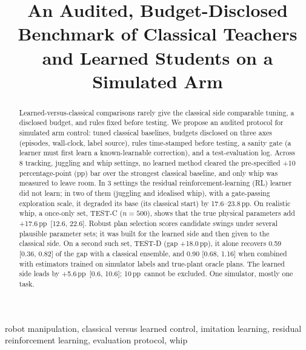 \documentclass[conference]{IEEEtran}
\newcommand{\pp}{\,pp}
\begin{document}
\title{An Audited, Budget-Disclosed Benchmark of Classical Teachers\\and Learned Students on a Simulated Arm}

\author{
}

\maketitle

\begin{abstract}
Learned-versus-classical comparisons rarely give the classical side comparable tuning, a disclosed budget, and rules fixed before testing. We propose an audited protocol for simulated arm control: tuned classical baselines, budgets disclosed on three axes (episodes, wall-clock, label source), rules time-stamped before testing, a sanity gate (a learner must first learn a known-learnable correction), and a test-evaluation log. Across 8 tracking, juggling and whip settings, no learned method cleared the pre-specified +10 percentage-point (pp) bar over the strongest classical baseline, and only whip was measured to leave room. In 3 settings the residual reinforcement-learning (RL) learner did not learn; in two of them (juggling and idealised whip), with a gate-passing exploration scale, it degraded its base (its classical start) by 17.6--23.8\pp. On realistic whip, a once-only set, TEST-C ($n{=}500$), shows that the true physical parameters add +17.6\pp\ [12.6, 22.6]. Robust plan selection scores candidate swings under several plausible parameter sets; it was built for the learned side and then given to the classical side. On a second such set, TEST-D (gap +18.0\pp), it alone recovers 0.59 [0.36, 0.82] of the gap with a classical ensemble, and 0.90 [0.68, 1.16] when combined with estimators trained on simulator labels and true-plant oracle plans. The learned side leads by +5.6\pp\ [0.6, 10.6]; 10\pp\ cannot be excluded. One simulator, mostly one task.
\end{abstract}

\begin{IEEEkeywords}
robot manipulation, classical versus learned control, imitation learning, residual reinforcement learning, evaluation protocol, whip
\end{IEEEkeywords}
\end{document}
